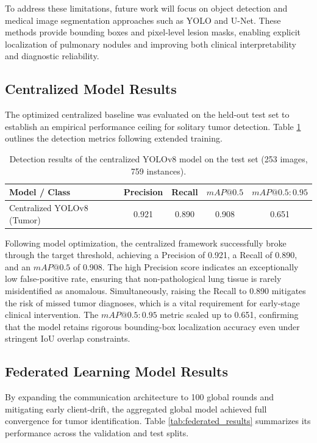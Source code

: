 To address these limitations, future work will focus on object detection and medical image segmentation approaches such as YOLO and U-Net. These methods provide bounding boxes and pixel-level lesion masks, enabling explicit localization of pulmonary nodules and improving both clinical interpretability and diagnostic reliability.

\subsection{Centralized Model Results}
The optimized centralized baseline was evaluated on the held-out test set to establish an empirical performance ceiling for solitary tumor detection. Table \ref{tab:centralized_results} outlines the detection metrics following extended training.

\begin{table}[htbp]
	\centering
	\caption{Detection results of the centralized YOLOv8 model on the test set (253 images, 759 instances).}
	\label{tab:centralized_results}
	\begin{tabular}{lcccc}
		\toprule
		\textbf{Model / Class} & \textbf{Precision} & \textbf{Recall} & \textbf{$mAP@0.5$} & \textbf{$mAP@0.5:0.95$} \\
		\midrule
		Centralized YOLOv8 (Tumor) & 0.921 & 0.890 & 0.908 & 0.651 \\
		\bottomrule
	\end{tabular}
\end{table}

Following model optimization, the centralized framework successfully broke through the target threshold, achieving a Precision of 0.921, a Recall of 0.890, and an $mAP@0.5$ of 0.908. The high Precision score indicates an exceptionally low false-positive rate, ensuring that non-pathological lung tissue is rarely misidentified as anomalous. Simultaneously, raising the Recall to 0.890 mitigates the risk of missed tumor diagnoses, which is a vital requirement for early-stage clinical intervention. The $mAP@0.5:0.95$ metric scaled up to 0.651, confirming that the model retains rigorous bounding-box localization accuracy even under stringent IoU overlap constraints.

\subsection{Federated Learning Model Results}
By expanding the communication architecture to 100 global rounds and mitigating early client-drift, the aggregated global model achieved full convergence for tumor identification. Table \ref{tab:federated_results} summarizes its performance across the validation and test splits.

